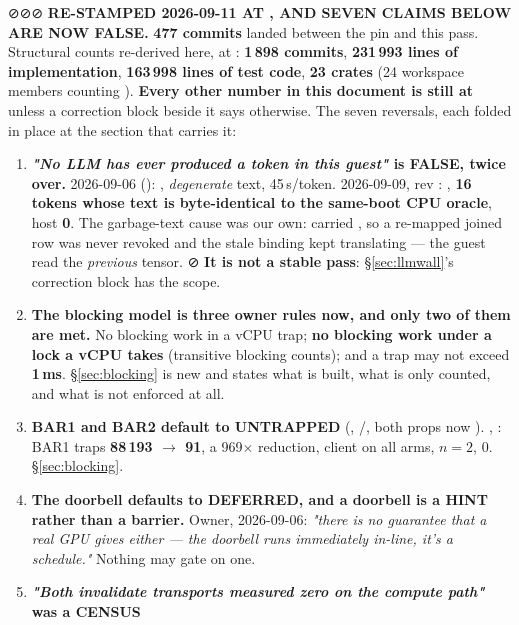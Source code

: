 \documentclass[10.5pt]{article}
\begin{document}
\begin{claimbox}
\smallskip
⊘⊘⊘ \textbf{RE-STAMPED 2026-09-11 AT , AND SEVEN CLAIMS BELOW ARE NOW FALSE.}
\textbf{477 commits} landed between the pin and this pass. Structural counts re-derived here, at
: \textbf{1\,898 commits}, \textbf{231\,993 lines of implementation},
\textbf{163\,998 lines of test code}, \textbf{23 crates} (24 workspace members counting
). \textbf{Every other number in this document is still \measured{} at
} unless a correction block beside it says otherwise. The seven reversals, each
folded in place at the section that carries it:
\begin{enumerate}\small
\item \textbf{\emph{"No LLM has ever produced a token in this guest"} is FALSE, twice over.}
  \measured{} 2026-09-06 (): , \emph{degenerate} text,
  45\,s/token. \measured{} 2026-09-09, rev : ,
  \textbf{16 tokens whose text is byte-identical to the same-boot CPU oracle}, host 
  \textbf{0}. The garbage-text cause was our own:  carried
  , so a re-mapped joined row was never revoked and the
  stale binding kept translating --- the guest read the \emph{previous} tensor.
  ⊘ \textbf{It is not a stable pass}: \S\ref{sec:llmwall}'s correction block has the scope.
\item \textbf{The blocking model is three owner rules now, and only two of them are met.} No
  blocking work in a vCPU trap; \textbf{no blocking work under a lock a vCPU takes} (transitive
  blocking counts); and a trap may not exceed \textbf{1\,ms}. \S\ref{sec:blocking} is new and
  states what is built, what is only counted, and what is not enforced at all.
\item \textbf{BAR1 and BAR2 default to UNTRAPPED} (, 
  /, both props now ). \measured{} ,
  : BAR1 traps \textbf{88\,193 $\to$ 91}, a 969$\times$ reduction, client
   on all arms, $n=2$,  0. \S\ref{sec:blocking}.
\item \textbf{The doorbell defaults to DEFERRED, and a doorbell is a HINT rather than a barrier.}
  Owner, 2026-09-06: \emph{"there is no guarantee that a real GPU gives either --- the doorbell
  runs immediately in-line, it's a schedule."} Nothing may gate on one.
\item \textbf{\emph{"Both invalidate transports measured zero on the compute path"} was a CENSUS
}
\end{enumerate}
\end{claimbox}
\end{document}
